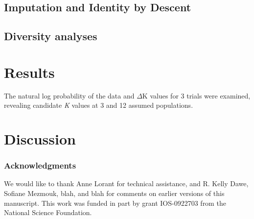 \documentclass[12pt]{article}
\begin{document}
\subsection{Imputation and Identity by Descent} %


\subsection{Diversity analyses} %


\section{Results}

The natural log probability of the data and  $\Delta$K values for 3 trials were examined, revealing candidate \emph{K} values at 3 and 12 assumed populations.    

\section{Discussion}

\subsubsection*{Acknowledgments}
We would like to thank Anne Lorant for technical assistance, and R. Kelly Dawe, Sofiane Mezmouk, blah, and blah for comments on earlier versions of this manuscript.  This work was funded in part by grant IOS-0922703 from the National Science Foundation.

\clearpage

\end{document}
